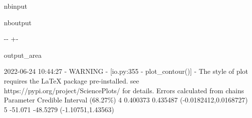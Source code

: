 \documentclass[letterpaper,10pt,english]{sphinxmanual}
\newlength\nbsphinxcodecellspacing
\begin{document}
\begin{sphinxuseclass}{nbinput}
{
\begin{sphinxVerbatim}[commandchars=\\\{\}]
\llap{\color{nbsphinxin}[10]:\,\hspace{\fboxrule}\hspace{\fboxsep}}
   
\PYG{p}{[}\PYG{p}{]}  
\PYG{p}{[}\PYG{p}{]}  
 
\end{sphinxVerbatim}
}

\end{sphinxuseclass}
\begin{sphinxuseclass}{nboutput}
{

\kern-\sphinxverbatimsmallskipamount\kern-\baselineskip
\kern+\FrameHeightAdjust\kern-\fboxrule
\vspace{\nbsphinxcodecellspacing}

\begin{sphinxuseclass}{output_area}
\begin{sphinxuseclass}{}


\begin{sphinxVerbatim}[commandchars=\\\{\}]
2022-06-24 10:44:27 - WARNING - [io.py:355 - plot\_contour()] - The style of plot requires the LaTeX package pre-installed. see https://pypi.org/project/SciencePlots/ for details.
Errors calculated from chains
 Parameter   Credible Interval (68.27\%)
     4     0.400373     0.435487    (-0.0182412,0.0168727)
     5      -51.071     -48.5279    (-1.10751,1.43563)
\end{sphinxVerbatim}



\end{sphinxuseclass}
\end{sphinxuseclass}
}

\end{sphinxuseclass}
\end{document}
